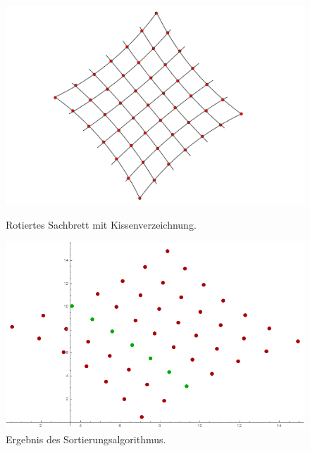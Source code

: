 \begin{figure}[!htb]
	\includegraphics[width=\linewidth]{images/extrBsp.png}
	\caption[Rotiertes Sachbrett mit Kissenverzeichnung]{Rotiertes Sachbrett mit Kissenverzeichnung.}
	\label{fig:Extreme9}
	\endminipage\hfill
	\includegraphics[width=\linewidth]{images/AlgExtrBsp.png}
	\caption[Sortierte Punkte eines rotierten Schachbretts mit Kissenverzeichnung]{Ergebnis des Sortierungsalgorithmus.}
	\label{fig:Extreme10}
	\endminipage\hfill
\end{figure}



